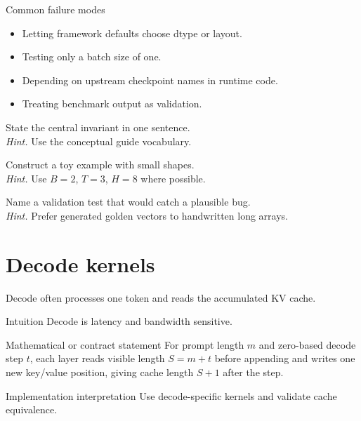 \begin{warningbox}{Common failure modes}
\begin{itemize}
\item Letting framework defaults choose dtype or layout.
\item Testing only a batch size of one.
\item Depending on upstream checkpoint names in runtime code.
\item Treating benchmark output as validation.
\end{itemize}
\end{warningbox}

\begin{chapterexercises}
\item State the central invariant in one sentence.\\
\textit{Hint.} Use the conceptual guide vocabulary.
\item Construct a toy example with small shapes.\\
\textit{Hint.} Use $B=2$, $T=3$, $H=8$ where possible.
\item Name a validation test that would catch a plausible bug.\\
\textit{Hint.} Prefer generated golden vectors to handwritten long arrays.
\end{chapterexercises}

\chapter{Decode kernels}
\label{ch:decode-kernels}
Decode often processes one token and reads the accumulated KV cache.



\begin{intuitionbox}{Intuition}
Decode is latency and bandwidth sensitive.
\end{intuitionbox}

\begin{definitionbox}{Mathematical or contract statement}
For prompt length \(m\) and zero-based decode step \(t\), each layer reads visible length \(S=m+t\) before appending and writes one new key/value position, giving cache length \(S+1\) after the step.
\end{definitionbox}

\begin{implementationbox}{Implementation interpretation}
Use decode-specific kernels and validate cache equivalence.
\end{implementationbox}

